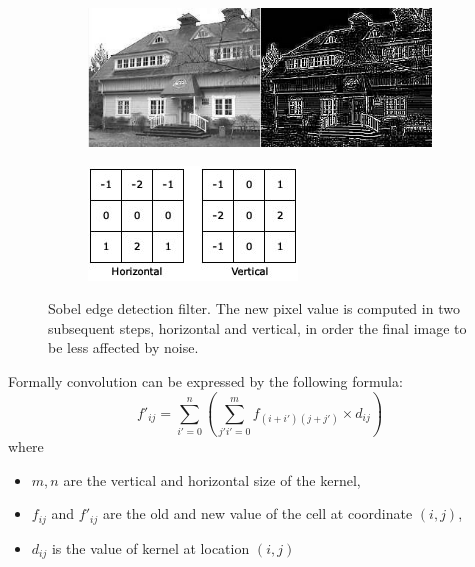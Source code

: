 \begin{figure}[!htb]
	\begin{subfigure}{1.0\textwidth}
		\includegraphics[width=\linewidth]{./images/opencal/sobel_example}
	\end{subfigure}
	
	\endminipage\hfill
	\begin{subfigure}{1.0\textwidth}
		\includegraphics[width=\linewidth]{./images/opencal/conv-sobel}	
	\end{subfigure}
	\endminipage\hfill
	\caption{Sobel edge detection filter. The new pixel value is computed in two subsequent steps, horizontal and vertical, in order the final image to be less affected by noise.}
	\label{fig:sobel}
\end{figure}

Formally convolution can be expressed by the following formula:
\begin{equation}
   f'_{ij} = \sum_{i'=0}^n (\sum_{j'i'=0}^m f_{(i+i')(j+j')}\times d_{ij})
   \label{eq:convolution}
\end{equation}
where 
\begin{itemize}
	\item $m,n$ are the  vertical and horizontal size of the kernel,
	\item $f_{ij}$ and $f'_{ij}$ are the old and new value of the cell at coordinate $(i,j)$,
	\item $d_{ij}$ is the value of kernel at location $(i,j)$ 
\end{itemize}

